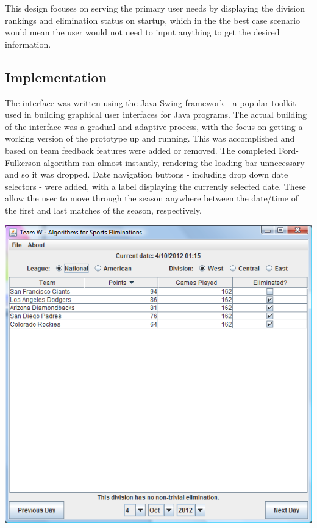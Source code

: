 This design focuses on serving the primary user needs by displaying the division 
rankings and elimination status on startup, which in the the best case scenario 
would mean the user would not need to input anything to get the desired information.

\subsection{Implementation}
The interface was written using the Java Swing framework - a popular toolkit used in
building graphical user interfaces for Java programs. The actual building of the interface
was a gradual and adaptive process, with the focus on getting a working version of the 
prototype up and running. This was accomplished and based on team feedback features were
added or removed. The completed Ford-Fulkerson algorithm ran almost instantly, rendering
the loading bar unnecessary and so it was dropped. Date navigation buttons - including drop
down date selectors - were added, with a label displaying the currently selected date. These 
allow the user to move through the season anywhere between the date/time of 
the first and last matches of the season, respectively.

\includegraphics[width=\linewidth,keepaspectratio]
{images/finalDesktopUI.png}

